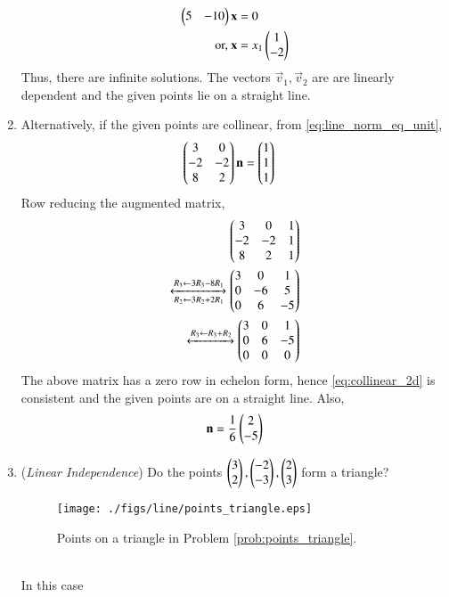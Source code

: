 \begin{enumerate}[label=\thesubsection.\arabic*.,ref=\thesubsection.\theenumi]
%
\begin{align}
\begin{pmatrix}5 & -10\end{pmatrix}\mathbf{x} &= 0
\\
\text{or, } \mathbf{x} &= x_1\begin{pmatrix}1\\-2\end{pmatrix}
\end{align}
Thus, there are infinite solutions.  The vectors $\vec{v}_1, \vec{v}_2$ are are linearly dependent and the given points  lie on a straight line.
\item Alternatively, if the given points are collinear, from \eqref{eq:line_norm_eq_unit},
\begin{align}
\label{eq:collinear_2d}
\begin{pmatrix}3&0 \\ -2&-2 \\ 8&2\end{pmatrix} \mathbf{n} &= \begin{pmatrix}1\\1\\1\end{pmatrix}
\end{align}
Row reducing the augmented matrix,
\begin{align}
\begin{pmatrix}3&0 & 1\\ -2&-2 & 1\\ 8&2 & 1\end{pmatrix} 
\\
\xleftrightarrow[R_2\leftarrow 3R_2+2R_1]{R_3\leftarrow 3R_3-8R_1}
\begin{pmatrix}3&0 & 1\\ 0&-6 & 5\\ 0&6 & -5\end{pmatrix}
\\
 \xleftrightarrow[]{R_3\leftarrow R_3+R_2}\begin{pmatrix}3&0 & 1\\ 0&6 & -5\\ 0&0 & 0\end{pmatrix}
\end{align}
The above matrix has a zero row in echelon form, hence \eqref{eq:collinear_2d}
is consistent and the given points are on a straight line. Also,
\begin{align}
\mathbf{n} = \frac{1}{6}\begin{pmatrix}2\\-5\end{pmatrix}
\end{align}
\item ({\em Linear Independence}) Do the points $\begin{pmatrix}3\\2\end{pmatrix},\begin{pmatrix}-2\\-3\end{pmatrix},\begin{pmatrix}2\\3\end{pmatrix}$ form a triangle?
\label{prob:points_triangle}
\begin{figure}
\centering
\texttt{[image: ./figs/line/points\_triangle.eps]}
\caption{ Points on a triangle in Problem \ref{prob:points_triangle}.}%
\label{fig:points_triangle}
\end{figure}
\\
\solution In this case
\begin{align}

\end{align}
\end{enumerate}
